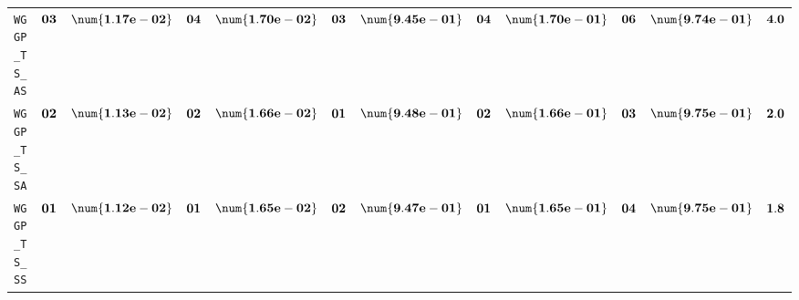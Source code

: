 \begin{xltabular}{\textwidth}{l||cC|cC|cC|cC|cC||c}
	\texttt{WGGP\_TS\_AS} & $\bf 03$ & $\bf \num{1.17e-02}$ & $\bf 04$ & $\bf \num{1.70e-02}$ & $\bf 03$ & $\bf \num{9.45e-01}$ & $\bf 04$ & $\bf \num{1.70e-01}$ & $\bf 06$ & $\bf \num{9.74e-01}$ & $\bf 4.0$  \\
	\texttt{WGGP\_TS\_SA} & $\bf 02$ & $\bf \num{1.13e-02}$ & $\bf 02$ & $\bf \num{1.66e-02}$ & $\bf 01$ & $\bf \num{9.48e-01}$ & $\bf 02$ & $\bf \num{1.66e-01}$ & $\bf 03$ & $\bf \num{9.75e-01}$ & $\bf 2.0$  \\
	\texttt{WGGP\_TS\_SS} & $\bf 01$ & $\bf \num{1.12e-02}$ & $\bf 01$ & $\bf \num{1.65e-02}$ & $\bf 02$ & $\bf \num{9.47e-01}$ & $\bf 01$ & $\bf \num{1.65e-01}$ & $\bf 04$ & $\bf \num{9.75e-01}$ & $\bf 1.8$  \\
\end{xltabular}
